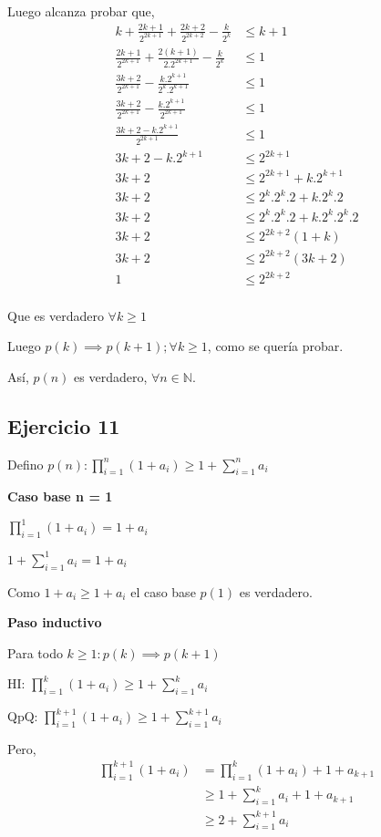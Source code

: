 Luego alcanza probar que,
\begin{align*}
    k + \frac{2k+1}{2^{2k+1}}+ \frac{2k+2}{2^{2k+2}} - \frac{k}{2^k} &\leq k+1 \\
    \frac{2k+1}{2^{2k+1}}+ \frac{2(k+1)}{2.2^{2k+1}} - \frac{k}{2^k} &\leq 1 \\
    \frac{3k+2}{2^{2k+1}} - \frac{k.2^{k+1}}{2^k.2^{k+1}} &\leq 1 \\
    \frac{3k+2}{2^{2k+1}} - \frac{k.2^{k+1}}{2^{2k+1}} &\leq 1 \\
    \frac{3k+2 - k.2^{k+1}}{2^{2k+1}} &\leq 1 \\
    3k+2 - k.2^{k+1} &\leq 2^{2k+1} \\
    3k+2 &\leq 2^{2k+1} + k.2^{k+1}\\
    3k+2 &\leq 2^k.2^k.2 + k.2^k.2\\
    3k+2 &\leq 2^k.2^k.2 + k.2^k.2^k.2\\
    3k+2 &\leq 2^{2k+2}(1+k)\\
    3k+2 &\leq 2^{2k+2}(3k+2)\\
    1 &\leq 2^{2k+2}\\
\end{align*}

Que es verdadero $\forall k \geq 1$

Luego $p(k) \implies p(k+1); \forall k \geq 1$, como se quería probar.

Así, $p(n)$ es verdadero, $\forall n \in \mathbb{N}$.

\subsection{Ejercicio 11}

Defino $ p(n): \prod_{i=1}^{n}(1+a_i)\geq 1+\sum_{i=1}^{n}a_i $

\textbf{Caso base n = 1}

$ \prod_{i=1}^{1}(1+a_i) = 1 + a_i $

$ 1+\sum_{i=1}^{1}a_i = 1+a_i $

Como $ 1 + a_i \geq 1 + a_i $ el caso base $p(1)$ es verdadero.

\textbf{Paso inductivo}

Para todo $k \geq 1: p(k) \implies p(k+1)$

HI: $\prod_{i=1}^{k}(1+a_i) \geq 1+\sum_{i=1}^{k}a_i$

QpQ: $ \prod_{i=1}^{k+1}(1+a_i) \geq 1+\sum_{i=1}^{k+1}a_i$

Pero,
\begin{align*}
    \prod_{i=1}^{k+1}(1+a_i) &= \prod_{i=1}^{k}(1+a_i) + 1+a_{k+1} \\
    &\geq 1+\sum_{i=1}^{k}a_i + 1+a_{k+1} \\
    &\geq 2+\sum_{i=1}^{k+1}a_i \\
\end{align*}

